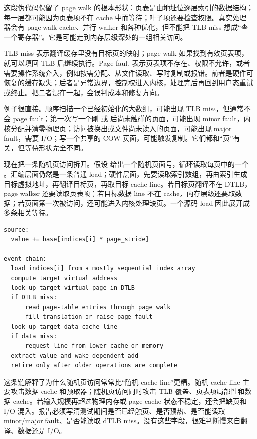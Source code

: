 这段伪代码保留了 page walk 的根本形状：页表是由地址位逐层索引的数据结构；每一层都可能因为页表项不在 cache 中而等待；叶子项还要检查权限。真实处理器会有 page walk cache、并行 walker 和各种优化，但不能把 TLB miss 想成“查一个寄存器”。它是可能走到内存层级深处的一组相关访问。

TLB miss 表示翻译缓存里没有目标页的映射；page walk 如果找到有效页表项，就可以填回 TLB 后继续执行。Page fault 表示页表项不存在、权限不允许，或者需要操作系统介入，例如按需分配、从文件读取、写时复制或报错。前者是硬件可恢复的缓存缺失；后者是异常边界，控制权进入内核，处理完后再回到用户态重试或终止。把二者混在一起，会误判成本和修复方向。

例子很直接。顺序扫描一个已经初始化的大数组，可能出现 TLB miss，但通常不会 page fault；第一次写一个刚  或  后尚未触碰的页面，可能出现 minor fault，内核分配并清零物理页；访问被换出或文件尚未读入的页面，可能出现 major fault，需要 I/O；写一个共享的 COW 页面，可能触发复制。它们都和“页”有关，但等待形状完全不同。

现在把一条随机页访问拆开。假设  给出一个随机页面号，循环读取每页中的一个 。汇编层面仍然是一条普通 load；硬件层面，先要读取索引数组，再由索引生成目标虚拟地址，再翻译目标页，再取目标 cache line。若目标页翻译不在 DTLB，page walker 还要读取页表项；若目标数据 line 不在 cache，内存层级还要取数据；若页面第一次被访问，还可能进入内核处理缺页。一个源码 load 因此展开成多条相关等待。

\begin{lstlisting}[numbers=none,caption={随机页 load 的底层事件链}]
source:
  value += base[indices[i] * page_stride]

event chain:
  load indices[i] from a mostly sequential index array
  compute target virtual address
  look up target virtual page in DTLB
  if DTLB miss:
      read page-table entries through page walk
      fill translation or raise page fault
  look up target data cache line
  if data miss:
      request line from lower cache or memory
  extract value and wake dependent add
  retire only after older operations are complete
\end{lstlisting}

这条链解释了为什么随机页访问常常比“随机 cache line”更糟。随机 cache line 主要攻击数据 cache 和预取器；随机页访问同时攻击 TLB 覆盖、页表项局部性和数据 cache。若输入规模再超过物理内存或 page cache 状态不稳定，还会把缺页和 I/O 混入。报告必须写清测试期间是否已经触页、是否预热、是否能读取 minor/major fault、是否能读取 dTLB miss。没有这些字段，很难判断慢来自翻译、数据还是 I/O。

